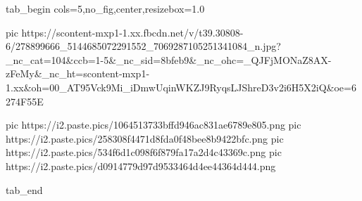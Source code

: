  
 
 
 
 

\ifcmt
  tab_begin cols=5,no_fig,center,resizebox=1.0

     pic https://scontent-mxp1-1.xx.fbcdn.net/v/t39.30808-6/278899666_5144685072291552_7069287105251341084_n.jpg?_nc_cat=104&ccb=1-5&_nc_sid=8bfeb9&_nc_ohc=_QJFjMONaZ8AX-zFeMy&_nc_ht=scontent-mxp1-1.xx&oh=00_AT95Vck9Mi_iDmwUqinWKZJ9RyqsLJShreD3v2i6H5X2iQ&oe=6274F55E
		 
		 pic https://i2.paste.pics/1064513733bffd946ac831ae6789e805.png
		 pic https://i2.paste.pics/258308f4471d8fda0f48bee8b9422bfc.png
		 pic https://i2.paste.pics/534f6d1c098f6f879fa17a2d4c43369c.png
		 pic https://i2.paste.pics/d0914779d97d9533464d4ee44364d444.png

  tab_end
\fi
